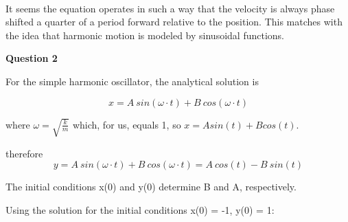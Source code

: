 \documentclass[11pt]{article}
\begin{document}
    \begin{center}
    \end{center}
    { \hspace*{\fill} \\}
    
    It seems the equation operates in such a way that the velocity is always
phase shifted a quarter of a period forward relative to the position.
This matches with the idea that harmonic motion is modeled by sinusoidal
functions.

    \textbf{Question 2}

    For the simple harmonic oscillator, the analytical solution is

\[x = A \ sin(\omega \cdot t) + B \ cos(\omega \cdot t)\]

where \(\omega = \sqrt{\frac{k}{m}}\) which, for us, equals 1, so
\(x = A sin(t) + B cos(t)\).

therefore
\[ y = A \ sin(\omega \cdot t) + B \ cos(\omega \cdot t)= A \ cos(t) - B \ sin(t)\]

The initial conditions x(0) and y(0) determine B and A, respectively.

Using the solution for the initial conditions x(0) = -1, y(0) = 1:
\end{document}
